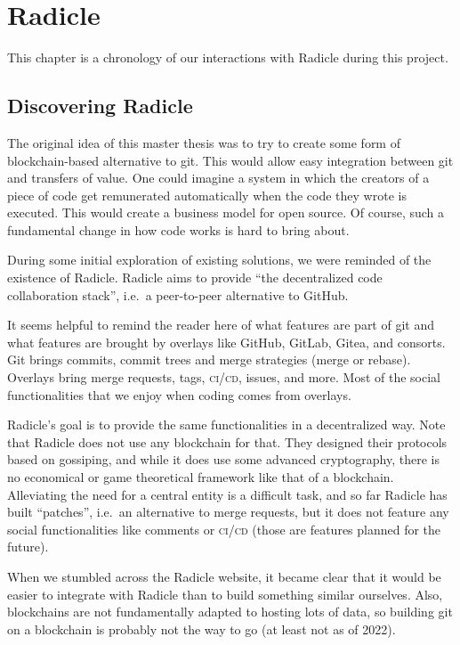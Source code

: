 \chapter{Radicle}
\label{sec:radicle}

This chapter is a chronology of our interactions with Radicle during this project.

\section{Discovering Radicle}

The original idea of this master thesis was to try to create some form of blockchain-based alternative to git.
This would allow easy integration between git and transfers of value.
One could imagine a system in which the creators of a piece of code get remunerated automatically when the code they wrote is executed.
This would create a business model for open source.
Of course, such a fundamental change in how code works is hard to bring about.

\marginElement{\centering}%
During some initial exploration of existing solutions, we were reminded of the existence of Radicle.
Radicle aims to provide \enquote{the decentralized code collaboration stack}, i.e.\ a peer-to-peer alternative to GitHub.

It seems helpful to remind the reader here of what features are part of git and what features are brought by overlays like GitHub, GitLab, Gitea, and consorts.
Git brings commits, commit trees and merge strategies (merge or rebase).
Overlays bring merge requests, tags, \textsc{ci/cd}, issues, and more.
Most of the social functionalities that we enjoy when coding comes from overlays.

Radicle's goal is to provide the same functionalities in a decentralized way.
Note that Radicle does not use any blockchain for that.
They designed their protocols based on gossiping, and while it does use some advanced cryptography, there is no economical or game theoretical framework like that of a blockchain.
Alleviating the need for a central entity is a difficult task, and so far Radicle has built \enquote{patches}, i.e.\ an alternative to merge requests, but it does not feature any social functionalities like comments or \textsc{ci/cd} (those are features planned for the future).

When we stumbled across the Radicle website, it became clear that it would be easier to integrate with Radicle than to build something similar ourselves.
Also, blockchains are not fundamentally adapted to hosting lots of data, so building git on a blockchain is probably not the way to go (at least not as of 2022).

